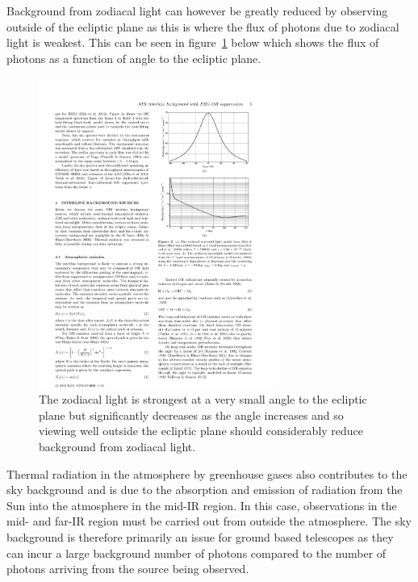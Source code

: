 		Background from zodiacal light can however be greatly reduced by observing outside of the ecliptic plane as this is where the flux of photons due to zodiacal light is weakest. This can be seen in figure~\ref{fig:zodiacal_light_graph} below which shows the flux of photons as a function of angle to the ecliptic plane.
		\begin{figure}[!htb]
			\centering
			\includegraphics[trim = 110mm 198mm 25mm 30mm, clip, width=0.7\textwidth]{../Images/zodiacal_Light_graph.pdf}
			\caption[Zodiacal light vs angle]{The zodiacal light is strongest at a very small angle to the ecliptic plane but significantly decreases as the angle increases and so viewing well outside the ecliptic plane should considerably reduce background from zodiacal light\cite{Zodiacal_Light_over_La_Silla}.}\label{fig:zodiacal_light_graph}
		\end{figure}

		Thermal radiation in the atmosphere by greenhouse gases also contributes to the sky background and is due to the absorption and emission of radiation from the Sun into the atmosphere in the mid-IR region. In this case, observations in the mid- and far-IR region must be carried out from outside the atmosphere\cite{Extragalactic_Astronomy_and_Cosmology}. The sky background is therefore primarily an issue for ground based telescopes as they can incur a large background number of photons compared to the number of photons arriving from the source being observed.


